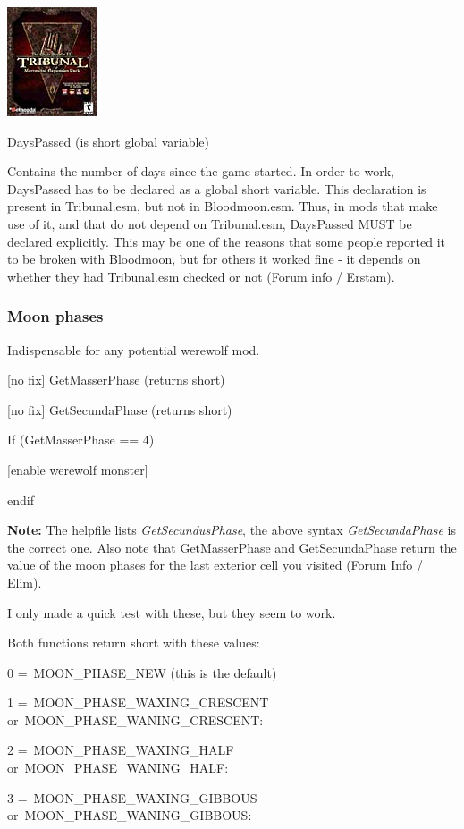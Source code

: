 \documentclass[
]{article}
\begin{document}
\includegraphics{media/image6.png}

DaysPassed (is short global variable)

Contains the number of days since the game started. In order to work,
DaysPassed has to be declared as a global short variable. This
declaration is present in Tribunal.esm, but not in Bloodmoon.esm. Thus,
in mods that make use of it, and that do not depend on Tribunal.esm,
DaysPassed MUST be declared explicitly. This may be one of the reasons
that some people reported it to be broken with Bloodmoon, but for others
it worked fine - it depends on whether they had Tribunal.esm checked or
not (Forum info / Erstam).

\hypertarget{moon-phases}{%
\subsubsection{Moon phases}\label{moon-phases}}

Indispensable for any potential werewolf mod.

{[}no fix{]} GetMasserPhase (returns short)

{[}no fix{]} GetSecundaPhase (returns short)

If (GetMasserPhase == 4)

{[}enable werewolf monster{]}

endif

\textbf{Note:} The helpfile lists \emph{GetSecundusPhase}, the above
syntax \emph{GetSecundaPhase} is the correct one. Also note that
GetMasserPhase and GetSecundaPhase return the value of the moon phases
for the last exterior cell you visited (Forum Info / Elim).

I only made a quick test with these, but they seem to work.

Both functions return short with these values:

0 =~MOON\_PHASE\_NEW (this is the default)

1 =~MOON\_PHASE\_WAXING\_CRESCENT or~MOON\_PHASE\_WANING\_CRESCENT:

2 =~MOON\_PHASE\_WAXING\_HALF or~MOON\_PHASE\_WANING\_HALF:

3 =~MOON\_PHASE\_WAXING\_GIBBOUS or~MOON\_PHASE\_WANING\_GIBBOUS:
\end{document}
